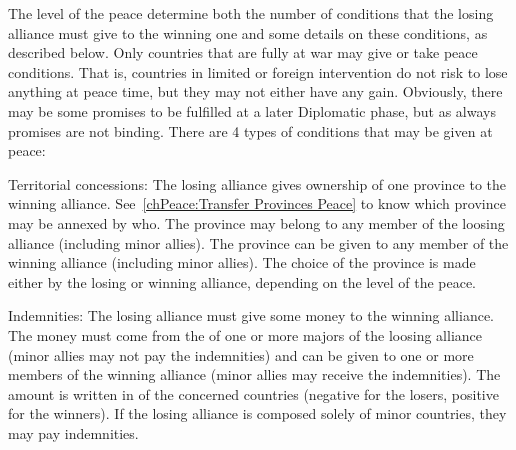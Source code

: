  The level of the peace determine both the number of
conditions that the losing alliance must give to the winning one and some
details on these conditions, as described below.
\bparag Only countries that are fully at war may give or take peace
conditions. That is, countries in limited or foreign intervention do not risk
to lose anything at peace time, but they may not either have any
gain. Obviously, there may be some promises to be fulfilled at a later
Diplomatic phase, but as always promises are not binding.
\bparag There are 4 types of conditions that may be given at peace:
\begin{modlist}
\item[Territorial concessions:] The losing alliance gives ownership of one
  province to the winning alliance. See~\ref{chPeace:Transfer Provinces Peace}
  to know which province may be annexed by who. The province may belong to any
  member of the loosing alliance (including minor allies). The province can be
  given to any member of the winning alliance (including minor allies). The
  choice of the province is made either by the losing or winning alliance,
  depending on the level of the peace.
\item[Indemnities:] The losing alliance must give some money to the winning
  alliance. The money must come from the \RT of one or more majors of the
  loosing alliance (minor allies may not pay the indemnities) and can be given
  to one or more members of the winning alliance (minor allies may receive the
  indemnities). The amount is written in  of the
  concerned countries (negative for the losers, positive for the winners). If
  the losing alliance is composed solely of minor countries, they may pay
  indemnities.


\end{modlist}
